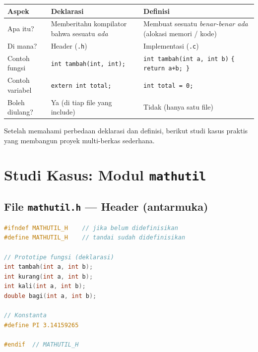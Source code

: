 \documentclass[../main.tex]{subfiles}
\begin{document}
{\small
\begin{tabularx}{\textwidth}{@{}|>{\raggedright\arraybackslash}p{2.2cm}|>{\raggedright\arraybackslash}p{5.8cm}|>{\raggedright\arraybackslash}X|@{}}
\hline
\textbf{Aspek} & \textbf{Deklarasi} & \textbf{Definisi} \\
\hline
Apa itu? & Memberitahu kompilator bahwa sesuatu \textit{ada} & Membuat sesuatu \textit{benar-benar ada} (alokasi memori / kode) \\
\hline
Di mana? & Header (\texttt{.h}) & Implementasi (\texttt{.c}) \\
\hline
Contoh fungsi & \texttt{int tambah(int, int);} & \texttt{int tambah(int a, int b)} \newline \texttt{\{ return a+b; \}} \\
\hline
Contoh variabel & \texttt{extern int total;} & \texttt{int total = 0;} \\
\hline
Boleh diulang? & Ya (di tiap file yang include) & Tidak (hanya satu file) \\
\end{tabularx}
\par
}

Setelah memahami perbedaan deklarasi dan definisi, berikut studi kasus praktis yang membangun proyek multi-berkas sederhana.

\section{Studi Kasus: Modul \texttt{mathutil}}

\subsection{File \texttt{mathutil.h} --- Header (antarmuka)}

\begin{lstlisting}[language=C,caption=\texttt{mathutil.h} dengan include guard]
#ifndef MATHUTIL_H    // jika belum didefinisikan
#define MATHUTIL_H    // tandai sudah didefinisikan

// Prototipe fungsi (deklarasi)
int tambah(int a, int b);
int kurang(int a, int b);
int kali(int a, int b);
double bagi(int a, int b);

// Konstanta
#define PI 3.14159265

#endif  // MATHUTIL_H
\end{lstlisting}
\end{document}
